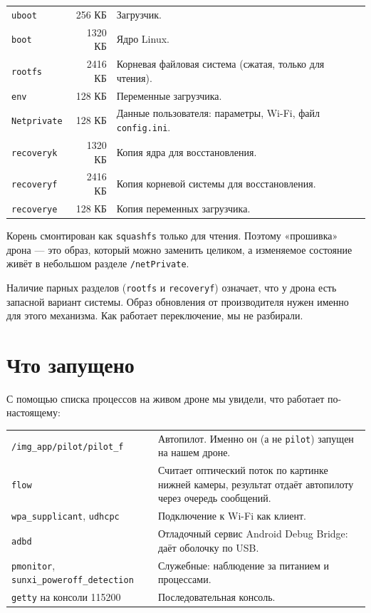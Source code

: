 \begin{tabularx}{\textwidth}{@{}l r Y@{}}
\toprule
{} &  &  \\ \midrule
\texttt{uboot} & 256 КБ & Загрузчик. \\
\texttt{boot} & 1320 КБ & Ядро Linux. \\
\texttt{rootfs} & 2416 КБ & Корневая файловая система (сжатая, только для чтения). \\
\texttt{env} & 128 КБ & Переменные загрузчика. \\
\texttt{Netprivate} & 128 КБ & Данные пользователя: параметры, Wi-Fi, файл \texttt{config.ini}. \\
\texttt{recoveryk} & 1320 КБ & Копия ядра для восстановления. \\
\texttt{recoveryf} & 2416 КБ & Копия корневой системы для восстановления. \\
\texttt{recoverye} & 128 КБ & Копия переменных загрузчика. \\ \bottomrule
\end{tabularx}

\vspace{4pt}
Корень смонтирован как \texttt{squashfs} только для чтения. Поэтому «прошивка» дрона --- это образ, который можно заменить целиком, а изменяемое состояние живёт в небольшом разделе \texttt{/netPrivate}. \pr{}

\begin{zametka}
Наличие парных разделов (\texttt{rootfs} и \texttt{recoveryf}) означает, что у дрона есть запасной вариант системы. Образ обновления от производителя нужен именно для этого механизма. Как работает переключение, мы не разбирали. \nei{}
\end{zametka}

\section{Что запущено}

С помощью списка процессов на живом дроне мы увидели, что работает по-настоящему:

\begin{tabularx}{\textwidth}{@{}p{4.4cm} Y@{}}
\toprule
{} &  \\ \midrule
\texttt{/img\_app/pilot/pilot\_f} & Автопилот. Именно он (а не \texttt{pilot}) запущен на нашем дроне. \pr{} \\
\texttt{flow} & Считает оптический поток по картинке нижней камеры, результат отдаёт автопилоту через очередь сообщений. \pr{} \\
\texttt{wpa\_supplicant}, \texttt{udhcpc} & Подключение к Wi-Fi как клиент. \pr{} \\
\texttt{adbd} & Отладочный сервис Android Debug Bridge: даёт оболочку по USB. \pr{} \\
\texttt{pmonitor}, \texttt{sunxi\_poweroff\_detection} & Служебные: наблюдение за питанием и процессами. \pr{} \\
\texttt{getty} на консоли 115200 & Последовательная консоль. \pr{} \\ \bottomrule
\end{tabularx}

